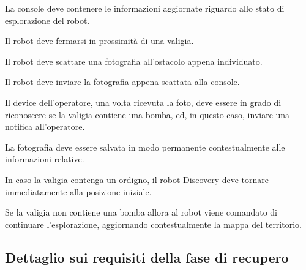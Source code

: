 \begin{description}[itemsep=1em]
  La console deve contenere le informazioni aggiornate riguardo allo stato di esplorazione del robot.

  \item[\requirementref{R-stopAtBag}]

  Il robot deve fermarsi in prossimità di una valigia.

  \item[\requirementref{R-takePhoto}]

  Il robot deve scattare una fotografia all'ostacolo appena individuato.

  \item[\requirementref{R-sendPhoto}]

  Il robot deve inviare la fotografia appena scattata alla console.

  \item[\requirementref{R-alert}]

  Il device dell'operatore, una volta ricevuta la foto, deve essere in grado di riconoscere
  se la valigia contiene una bomba, ed, in questo caso, inviare una notifica all'operatore.

  \item[\requirementref{R-storePhoto}]

  La fotografia deve essere salvata in modo permanente contestualmente alle informazioni relative.

  \item[\requirementref{R-backHomeSinceBomb}]

  In caso la valigia contenga un ordigno, il robot Discovery deve tornare immediatamente alla posizione iniziale.

  \item[\requirementref{R-continueExploreAfterPhoto}]

  Se la valigia non contiene una bomba allora al robot viene comandato di continuare l'esplorazione, aggiornando contestualmente la mappa del territorio.
\end{description}

\subsection{Dettaglio sui requisiti della fase di recupero}

